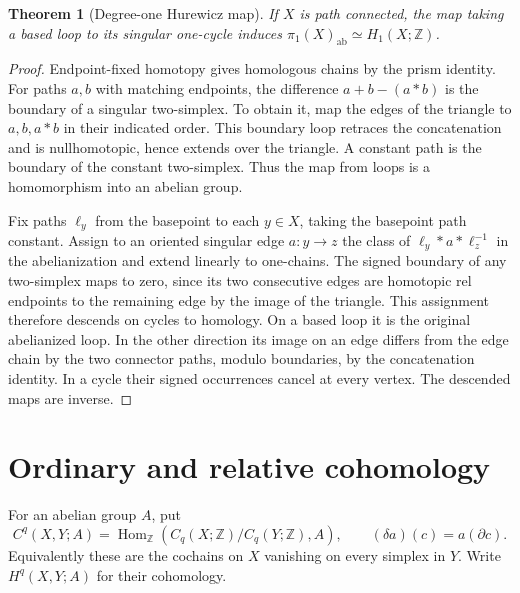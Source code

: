 \documentclass[11pt,oneside,openany]{book}
\theoremstyle{plain}
\newtheorem{theorem}{Theorem}[chapter]
\theoremstyle{definition}
\theoremstyle{remark}
\begin{document}
\begin{theorem}[Degree-one Hurewicz map]\label{thm:p202-hurewicz-one}
If \(X\) is path connected, the map taking a based loop to
its singular one-cycle induces
\(\pi_1(X)_{\mathrm{ab}}\simeq H_1(X;\mathbb Z)\).
\end{theorem}
\begin{proof}
Endpoint-fixed homotopy gives homologous chains by the prism
identity. For paths \(a,b\) with matching endpoints, the
difference \(a+b-(a*b)\) is the boundary of a singular
two-simplex. To obtain it, map the edges of the triangle to
\(a,b,a*b\) in their indicated order. This boundary loop
retraces the concatenation and is nullhomotopic, hence
extends over the triangle. A constant path is the boundary
of the constant two-simplex. Thus the map from loops is a
homomorphism into an abelian group.

Fix paths \(\ell_y\) from the basepoint to each \(y\in X\),
taking the basepoint path constant. Assign to an oriented
singular edge \(a:y\to z\) the class of
\(\ell_y*a*\ell_z^{-1}\) in the abelianization and extend
linearly to one-chains. The signed boundary of any
two-simplex maps to zero, since its two consecutive edges
are homotopic rel endpoints to the remaining edge by the
image of the triangle. This assignment therefore descends
on cycles to homology. On a based loop it is the original
abelianized loop. In the other direction its image on an
edge differs from the edge chain by the two connector paths,
modulo boundaries, by the concatenation identity. In a
cycle their signed occurrences cancel at every vertex.
The descended maps are inverse.
\end{proof}

\section{Ordinary and relative cohomology}\label{p202:T23}

For an abelian group \(A\), put
\[
 C^q(X,Y;A)=\operatorname{Hom}_{\mathbb Z}
       (C_q(X;\mathbb Z)/C_q(Y;\mathbb Z),A),
 \qquad (\delta a)(c)=a(\partial c).
\]
Equivalently these are the cochains on \(X\) vanishing on every
simplex in \(Y\). Write \(H^q(X,Y;A)\) for their cohomology.
\end{document}
